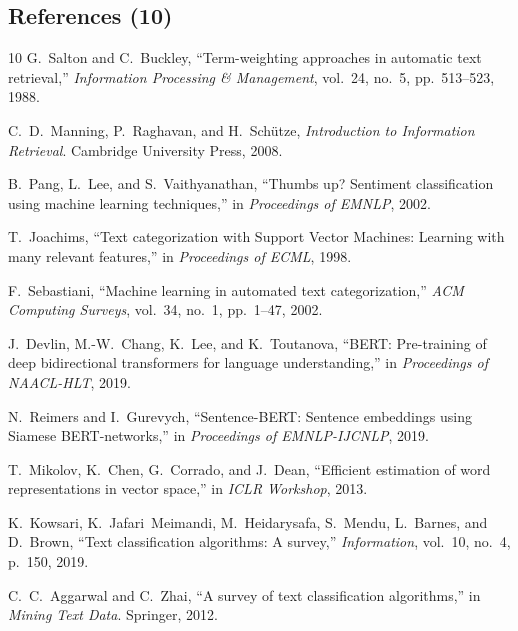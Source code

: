 \documentclass[12pt]{article}
\begin{document}
\subsection*{References (10)}
\begin{thebibliography}{10}
 G.~Salton and C.~Buckley, ``Term-weighting approaches in automatic text retrieval,'' \emph{Information Processing \& Management}, vol.~24, no.~5, pp.~513--523, 1988.

 C.~D.~Manning, P.~Raghavan, and H.~Sch\"utze, \emph{Introduction to Information Retrieval}. Cambridge University Press, 2008.

 B.~Pang, L.~Lee, and S.~Vaithyanathan, ``Thumbs up? Sentiment classification using machine learning techniques,'' in \emph{Proceedings of EMNLP}, 2002.

 T.~Joachims, ``Text categorization with Support Vector Machines: Learning with many relevant features,'' in \emph{Proceedings of ECML}, 1998.

 F.~Sebastiani, ``Machine learning in automated text categorization,'' \emph{ACM Computing Surveys}, vol.~34, no.~1, pp.~1--47, 2002.

 J.~Devlin, M.-W.~Chang, K.~Lee, and K.~Toutanova, ``BERT: Pre-training of deep bidirectional transformers for language understanding,'' in \emph{Proceedings of NAACL-HLT}, 2019.

 N.~Reimers and I.~Gurevych, ``Sentence-BERT: Sentence embeddings using Siamese BERT-networks,'' in \emph{Proceedings of EMNLP-IJCNLP}, 2019.

 T.~Mikolov, K.~Chen, G.~Corrado, and J.~Dean, ``Efficient estimation of word representations in vector space,'' in \emph{ICLR Workshop}, 2013.

 K.~Kowsari, K.~Jafari~Meimandi, M.~Heidarysafa, S.~Mendu, L.~Barnes, and D.~Brown, ``Text classification algorithms: A survey,'' \emph{Information}, vol.~10, no.~4, p.~150, 2019.

 C.~C.~Aggarwal and C.~Zhai, ``A survey of text classification algorithms,'' in \emph{Mining Text Data}. Springer, 2012.
\end{thebibliography}
\end{document}
